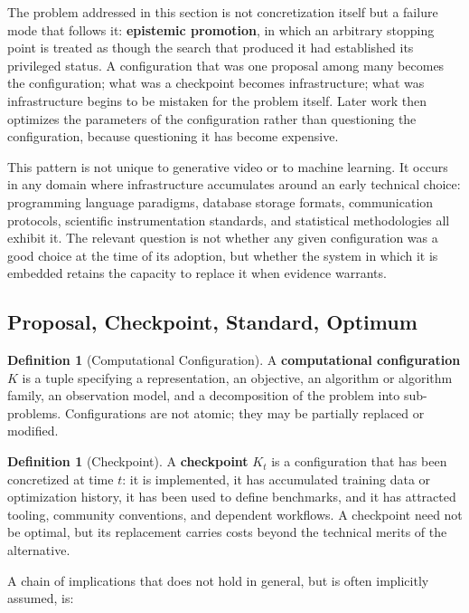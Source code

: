 \documentclass[11pt,a4paper]{article}
\theoremstyle{plain}
\theoremstyle{definition}
\newtheorem{definition}[theorem]{Definition}
\theoremstyle{remark}
\begin{document}
The problem addressed in this section is not concretization itself but a failure mode that follows it: \textbf{epistemic promotion}, in which an arbitrary stopping point is treated as though the search that produced it had established its privileged status. A configuration that was one proposal among many becomes the configuration; what was a checkpoint becomes infrastructure; what was infrastructure begins to be mistaken for the problem itself. Later work then optimizes the parameters of the configuration rather than questioning the configuration, because questioning it has become expensive.

This pattern is not unique to generative video or to machine learning. It occurs in any domain where infrastructure accumulates around an early technical choice: programming language paradigms, database storage formats, communication protocols, scientific instrumentation standards, and statistical methodologies all exhibit it. The relevant question is not whether any given configuration was a good choice at the time of its adoption, but whether the system in which it is embedded retains the capacity to replace it when evidence warrants.

\subsection{Proposal, Checkpoint, Standard, Optimum}

\begin{definition}[Computational Configuration]
A \textbf{computational configuration} $K$ is a tuple specifying a representation, an objective, an algorithm or algorithm family, an observation model, and a decomposition of the problem into sub-problems. Configurations are not atomic; they may be partially replaced or modified.
\end{definition}

\begin{definition}[Checkpoint]
A \textbf{checkpoint} $K_t$ is a configuration that has been concretized at time $t$: it is implemented, it has accumulated training data or optimization history, it has been used to define benchmarks, and it has attracted tooling, community conventions, and dependent workflows. A checkpoint need not be optimal, but its replacement carries costs beyond the technical merits of the alternative.
\end{definition}

A chain of implications that does not hold in general, but is often implicitly assumed, is:
\end{document}
